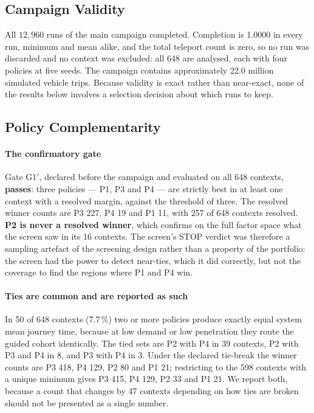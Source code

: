 \documentclass[preprint,12pt]{elsarticle}
\begin{document}
\subsection{Campaign Validity}
\label{sec:validity}

All $12{,}960$ runs of the main campaign completed. Completion is 1.0000 in
every run, minimum and mean alike, and the total teleport count is zero, so no
run was discarded and no context was excluded: all 648 are analysed, each with
four policies at five seeds. The campaign contains approximately 22.0 million
simulated vehicle trips. Because validity is exact rather than near-exact, none
of the results below involves a selection decision about which runs to keep.

\subsection{Policy Complementarity}
\label{sec:complementarity}

\paragraph{The confirmatory gate}
Gate G1$'$, declared before the campaign and evaluated on all 648 contexts,
\textbf{passes}: three policies --- P1, P3 and P4 --- are strictly best in at
least one context with a resolved margin, against the threshold of three. The
resolved winner counts are P3 227, P4 19 and P1 11, with 257 of 648 contexts
resolved. \textbf{P2 is never a resolved winner}, which confirms on the full
factor space what the screen saw in its 16 contexts. The screen's STOP verdict
was therefore a sampling artefact of the screening design rather than a property
of the portfolio: the screen had the power to detect near-ties, which it did
correctly, but not the coverage to find the regions where P1 and P4 win.

\paragraph{Ties are common and are reported as such}
In 50 of 648 contexts (7.7\,\%) two or more policies produce exactly equal system
mean journey time, because at low demand or low penetration they route the guided
cohort identically. The tied sets are P2 with P4 in 39 contexts, P2 with P3 and
P4 in 8, and P3 with P4 in 3. Under the declared tie-break the winner counts are
P3 418, P4 129, P2 80 and P1 21; restricting to the 598 contexts with a unique
minimum gives P3 415, P4 129, P2 33 and P1 21. We report both, because a count
that changes by 47 contexts depending on how ties are broken should not be
presented as a single number.
\end{document}
